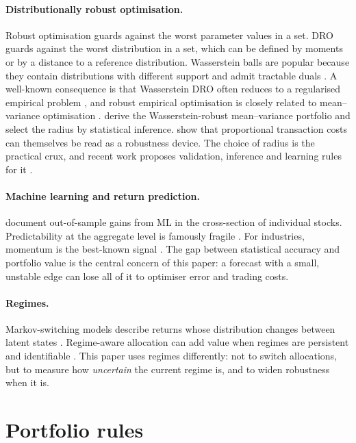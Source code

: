 \documentclass[11pt]{article}
\begin{document}
\paragraph{Distributionally robust optimisation.} Robust optimisation guards against the worst parameter values in a set. DRO guards against the worst distribution in a set, which can be defined by moments \citep{delage2010} or by a distance to a reference distribution. Wasserstein balls are popular because they contain distributions with different support and admit tractable duals \citep{esfahani2018,gao2023,kuhn2019}. A well-known consequence is that Wasserstein DRO often reduces to a regularised empirical problem \citep{blanchet2019}, and robust empirical optimisation is closely related to mean--variance optimisation \citep{gotoh2018}. \citet{blanchet2022} derive the Wasserstein-robust mean--variance portfolio and select the radius by statistical inference. \citet{olivares2018} show that proportional transaction costs can themselves be read as a robustness device. The choice of radius is the practical crux, and recent work proposes validation, inference and learning rules for it \citep{blanchet2022,long2025,guo2026a,guo2026b}.

\paragraph{Machine learning and return prediction.} \citet{gu2020} document out-of-sample gains from ML in the cross-section of individual stocks. Predictability at the aggregate level is famously fragile \citep{welch2008}. For industries, momentum is the best-known signal \citep{moskowitz1999}. The gap between statistical accuracy and portfolio value is the central concern of this paper: a forecast with a small, unstable edge can lose all of it to optimiser error and trading costs.

\paragraph{Regimes.} Markov-switching models describe returns whose distribution changes between latent states \citep{hamilton1989}. Regime-aware allocation can add value when regimes are persistent and identifiable \citep{ang2002,guidolin2007,kritzman2012}. This paper uses regimes differently: not to switch allocations, but to measure how \emph{uncertain} the current regime is, and to widen robustness when it is.

\section{Portfolio rules}\label{sec:model}
\end{document}
